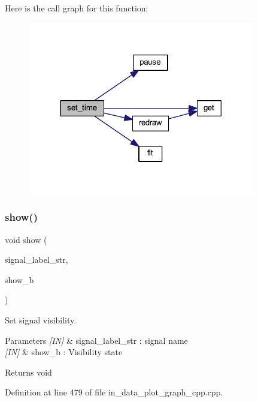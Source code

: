 Here is the call graph for this function\+:
\nopagebreak
\begin{figure}[H]
\begin{center}
\leavevmode
\includegraphics[width=281pt]{group__data__plot_gab0d8878374cdaa8e8430df9a6aa313e8_cgraph}
\end{center}
\end{figure}
\mbox{\label{group__data__plot_ga6ebd3de1e1c0236f8e54525ebe52fead}} 
\subsubsection{show()}
{\footnotesize\ttfamily void show (\begin{DoxyParamCaption}\item[{wx\+String}]{signal\+\_\+label\+\_\+str,  }\item[{bool}]{show\+\_\+b }\end{DoxyParamCaption})}



Set signal visibility. 


\begin{DoxyParams}{Parameters}
{\em \mbox{[}\+I\+N\mbox{]}} & signal\+\_\+label\+\_\+str \+: signal name \\
\hline
{\em \mbox{[}\+I\+N\mbox{]}} & show\+\_\+b \+: Visibility state \\
\hline
\end{DoxyParams}
\begin{DoxyReturn}{Returns}
void 
\end{DoxyReturn}


Definition at line 479 of file in\+\_\+data\+\_\+plot\+\_\+graph\+\_\+cpp.\+cpp.

